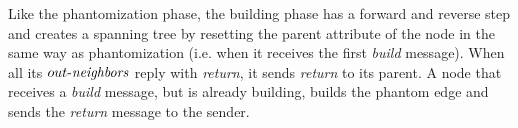 Like the phantomization phase, the building phase has a forward and reverse step and creates a spanning tree by resetting the parent attribute of the node in the same way as phantomization (i.e. when it
receives the first \emph{build} message). When all its $\mathop{\mbox{$out$-$\mathit{neighbors}$}}$ reply with \emph{return}, it sends \emph{return} to its parent.
A node that receives a \emph{build} message, but is already building, builds the phantom edge and sends the \emph{return} message to the sender.




